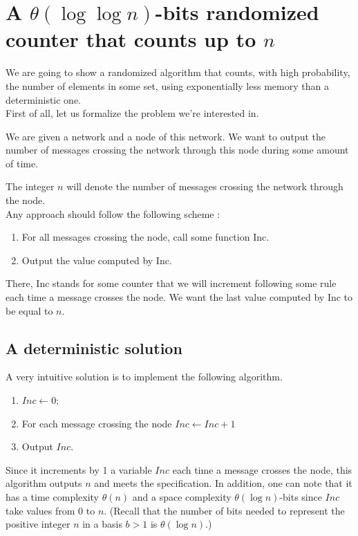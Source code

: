 \section{A $\theta\left(\log \log n\right)$-bits randomized counter that counts up to $n$}
We are going to show a randomized algorithm that counts, with high probability, the number of elements in some set, using exponentially less memory than a deterministic one.\\
First of all, let us formalize the problem we're interested in.

\begin{problem}
We are given a network and a node of this network. We want to output the number of messages crossing the network through this node during some amount of time.
\end{problem}

The integer $n$ will denote the number of messages crossing the network through the node.\\Any approach should follow the following scheme : 


\begin{enumerate}
	\item For all messages crossing the node, call some function Inc. 
	\item Output the value computed by Inc.
\end{enumerate}

There, Inc stands for some counter that we will increment following some rule each time a message crosses the node. We want the last value computed by Inc to be equal to $n$.

\subsection{A deterministic solution}
A very intuitive solution is to implement the following algorithm.
\begin{algo}
\begin{enumerate}
  \item $Inc \leftarrow 0$;
	\item For each message crossing the node $Inc\leftarrow Inc + 1$
	\item Output $Inc$.
\end{enumerate}
\end{algo}

Since it increments by 1 a variable $Inc$ each time a message crosses the node, this algorithm outputs $n$ and meets the specification. In addition, one can note that it has a time complexity $\theta\left(n\right)$ and a space complexity $\theta\left(\log n\right)$-bits since $Inc$ take values from $0$ to $n$. (Recall that the number of bits needed to represent the positive integer $n$ in a basis $b > 1$ is $\theta\left(\log n\right)$.)


